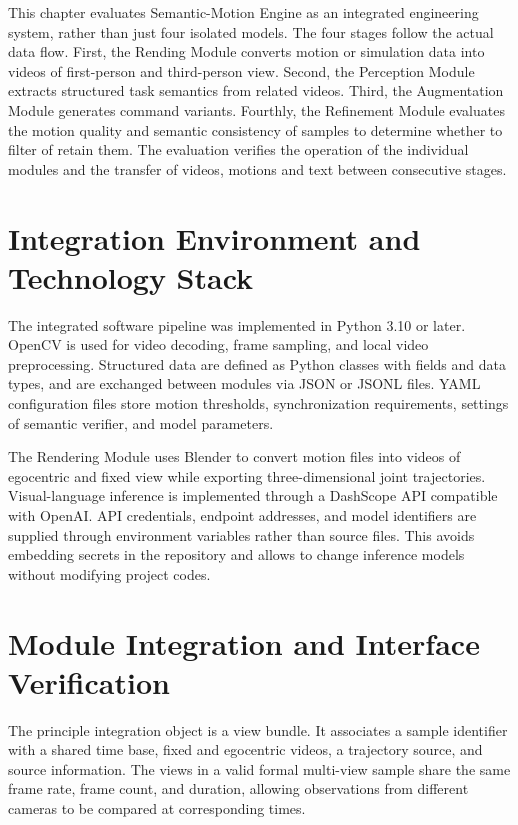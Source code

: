 \documentclass[11pt,oneside]{report}
\begin{document}
This chapter evaluates Semantic-Motion Engine as an integrated engineering system, rather than just four isolated models. The four stages follow the actual data flow. First, the Rending Module converts motion or simulation data into videos of first-person and third-person view. Second, the Perception Module extracts structured task semantics from related videos. Third, the Augmentation Module generates command variants. Fourthly, the Refinement Module evaluates the motion quality and semantic consistency of samples to determine whether to filter of retain them. The evaluation verifies the operation of the individual modules and the transfer of videos, motions and text between consecutive stages.

\section{Integration Environment and Technology Stack}

The integrated software pipeline was implemented in Python 3.10 or later. OpenCV is used for video decoding, frame sampling, and local video preprocessing. Structured data are defined as Python classes with fields and data types, and are exchanged between modules via JSON or JSONL files. YAML configuration files store motion thresholds, synchronization requirements, settings of semantic verifier, and model parameters. 

The Rendering Module uses Blender to convert motion files into videos of egocentric and fixed view while exporting three-dimensional joint trajectories. Visual-language inference is implemented through a DashScope API compatible with OpenAI. API credentials, endpoint addresses, and model identifiers are supplied through environment variables rather than source files. This avoids embedding secrets in the repository and allows to change inference models without modifying project codes.

\section{Module Integration and Interface Verification}

The principle integration object is a view bundle. It associates a sample identifier with a shared time base, fixed and egocentric videos, a trajectory source, and source information. The views in a valid formal multi-view sample share the same frame rate, frame count, and duration, allowing observations from different cameras to be compared at corresponding times.
\end{document}
